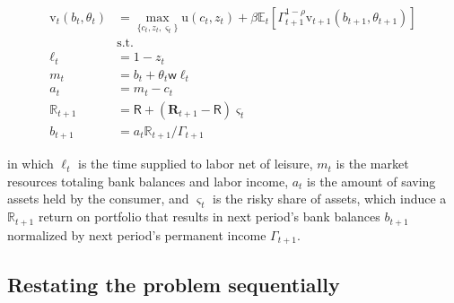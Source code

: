 \documentclass{article}
\newcommand{\DiscFac}{\beta}
\newcommand{\utilFunc}{\mathrm{u}}
\newcommand{\util}{u}
\newcommand{\tShkEmp}{\theta}
\newcommand{\Ex}{\mathbb{E}}
\newcommand{\CRRA}{\rho}
\newcommand{\h}{h}
\newcommand{\bRat}{b}
\newcommand{\leisure}{z}
\newcommand{\cRat}{c}
\newcommand{\vFunc}{\mathrm{v}}
\newcommand{\Rfree}{\mathsf{R}}
\newcommand{\wage}{\mathsf{w}}
\newcommand{\riskyshare}{\varsigma}
\newcommand{\PGro}{\Gamma}
\newcommand{\labor}{\ell}
\newcommand{\aRat}{a}
\newcommand{\mRat}{m}
\newcommand{\Rport}{\mathbb{R}}
\newcommand{\Risky}{\mathbf{R}}
\newcommand{\vEnd}{\mathfrak{v}}
\begin{document}
\begin{equation}
\begin{split}
    \vFunc_{t}(\bRat_{t}, \tShkEmp_{t}) & = \max_{\{\cRat_{t},
      \leisure_{t}, \riskyshare_{t}\}} \utilFunc(\cRat_{t}, \leisure_{t}) +
    \DiscFac \Ex_{t} \left[ \PGro_{t+1}^{1-\CRRA}
      \vFunc_{t+1} (\bRat_{t+1},
      \tShkEmp_{t+1}) \right] \\
    & \text{s.t.} \\
    \labor_{t} & = 1 - \leisure_{t} \\
    \mRat_{t} & = \bRat_{t} + \tShkEmp_{t} \wage \labor_{t} \\
    \aRat_{t} & = \mRat_{t} - \cRat_{t} \\
    \Rport_{t+1} & = \Rfree + (\Risky_{t+1} - \Rfree)
    \riskyshare_{t} \\
    \bRat_{t+1} & = \aRat_{t} \Rport_{t+1} / \PGro_{t+1}
  \end{split}
\end{equation}

in which $\labor_{t}$ is the time supplied to labor net of leisure, $\mRat_{t}$ is the market resources totaling bank balances and labor income, $\aRat_{t}$ is the amount of saving assets held by the consumer, and $\riskyshare_{t}$ is the risky share of assets, which induce a $\Rport_{t+1}$ return on portfolio that results in next period's bank balances $\bRat_{t+1}$ normalized by next period's permanent income $\PGro_{t+1}$.


\subsection{Restating the problem sequentially}\label{Restating the problem sequentially}
\end{document}
